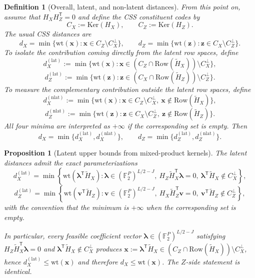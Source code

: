 \documentclass[10pt,a4paper]{amsart}
\newtheorem{definition}{Definition}
\newtheorem{proposition}{Proposition}
\newcommand{\Ftwo}{\mathbb{F}_2}
\newcommand{\Htil}{\tilde{H}}
\newcommand{\Ker}{\mathrm{Ker}}
\newcommand{\Row}{\mathrm{Row}}
\newcommand{\vect}[1]{\bm{#1}}
\newcommand{\vlambda}{\vect{\lambda}}
\newcommand{\vvct}{\vect{v}}
\newcommand{\vx}{\vect{x}}
\newcommand{\vz}{\vect{z}}
\newcommand{\wt}{\mathrm{wt}}
\begin{document}
\begin{definition}[Overall, latent, and non-latent distances]
\label{def:latent-nonlatent-distances-en}
From this point on, assume that $H_XH_Z^{\mathsf T}=0$ and define the CSS constituent codes by
\[
C_X:=\Ker(H_X),\qquad C_Z:=\Ker(H_Z).
\]
The usual CSS distances are
\[
d_X=\min\{\wt(\vx):\vx\in C_Z\setminus C_X^\perp\},\qquad
d_Z=\min\{\wt(\vz):\vz\in C_X\setminus C_Z^\perp\}.
\]
To isolate the contribution coming directly from the latent row spaces, define
\[
d_X^{(\mathrm{lat})}:=
\min\{\wt(\vx):\vx\in (C_Z\cap \Row(\Htil_X))\setminus C_X^\perp\},
\]
\[
d_Z^{(\mathrm{lat})}:=
\min\{\wt(\vz):\vz\in (C_X\cap \Row(\Htil_Z))\setminus C_Z^\perp\}.
\]
To measure the complementary contribution outside the latent row spaces, define
\[
d_X^{(\mathrm{nlat})}:=
\min\{\wt(\vx):\vx\in C_Z\setminus C_X^\perp,\ \vx\notin \Row(\Htil_X)\},
\]
\[
d_Z^{(\mathrm{nlat})}:=
\min\{\wt(\vz):\vz\in C_X\setminus C_Z^\perp,\ \vz\notin \Row(\Htil_Z)\}.
\]
All four minima are interpreted as $+\infty$ if the corresponding set is empty.
Then
\[
d_X=\min\{d_X^{(\mathrm{lat})},d_X^{(\mathrm{nlat})}\},
\qquad
d_Z=\min\{d_Z^{(\mathrm{lat})},d_Z^{(\mathrm{nlat})}\}.
\]
\end{definition}

\begin{proposition}[Latent upper bounds from mixed-product kernels]
\label{prop:latent-upper-en}
The latent distances admit the exact parameterizations
\[
d_X^{(\mathrm{lat})}
=
\min\left\{
\wt(\vlambda^{\mathsf T}\Htil_X):
\vlambda\in(\Ftwo^P)^{L/2-J},\ 
H_Z\Htil_X^{\mathsf T}\vlambda=0,\ 
\vlambda^{\mathsf T}\Htil_X\notin C_X^\perp
\right\},
\]
\[
d_Z^{(\mathrm{lat})}
=
\min\left\{
\wt(\vvct^{\mathsf T}\Htil_Z):
\vvct\in(\Ftwo^P)^{L/2-J},\ 
H_X\Htil_Z^{\mathsf T}\vvct=0,\ 
\vvct^{\mathsf T}\Htil_Z\notin C_Z^\perp
\right\},
\]
with the convention that the minimum is $+\infty$ when the corresponding set is empty.

In particular, every feasible coefficient vector
$\vlambda\in(\Ftwo^P)^{L/2-J}$ satisfying
$H_Z\Htil_X^{\mathsf T}\vlambda=0$ and
$\vlambda^{\mathsf T}\Htil_X\notin C_X^\perp$
produces
$\vx:=\vlambda^{\mathsf T}\Htil_X\in (C_Z\cap \Row(\Htil_X))\setminus C_X^\perp$,
hence $d_X^{(\mathrm{lat})}\le \wt(\vx)$ and therefore $d_X\le \wt(\vx)$.
The $Z$-side statement is identical.
\end{proposition}
\end{document}

